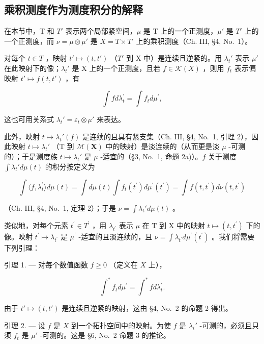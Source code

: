 \subsection{乘积测度作为测度积分的解释}

在本节中，T 和 \(T'\) 表示两个局部紧空间，\(\mu\) 是 T 上的一个正测度，\(\mu'\) 是 \(T'\) 上的一个正测度，而 \(\nu = \mu \otimes \mu'\) 是 \(X = T \times T'\) 上的乘积测度（Ch. III, §4, No.~1）。

对每个 \(t \in T\) ，映射 \(t' \mapsto (t, t')\) （\(T'\) 到 X 中）是连续且逆紧的。用 \(\lambda_t'\) 表示 \(\mu'\) 在此映射下的像；\(\lambda_t'\) 是 X 上的一个正测度，且若 \(f \in \mathcal{K}(X)\) ，则用 \(f_t\) 表示偏映射 \(t' \mapsto f(t, t')\) ，有

\[
\int f d \lambda_ {t} ^ {\prime} = \int f _ {t} d \mu^ {\prime},\tag{1}
\]

这也可用关系式 \(\lambda_t' = \varepsilon_t \otimes \mu'\) 来表达。

此外，映射 \(t \mapsto \lambda_t'(f)\) 是连续的且具有紧支集（Ch. III, §4, No.~1, 引理 2），因此映射 \(t \mapsto \lambda_t'\) （T 到 \(\mathcal{M}(\mathbf{X})\) 中的映射）是淡连续的（从而更是淡 \(\mu\) -可测的）；于是测度族 \(t \mapsto \lambda_t'\) 是 \(\mu\) -适宜的（§3, No.~1, 命题 2a)）。\(f\) 关于测度 \(\int \lambda_t' d\mu(t)\) 的积分按定义为

\[
\int \langle f, \lambda_ {t} ^ {\prime} \rangle d \mu (t) = \int d \mu (t) \int f _ {t} (t ^ {\prime}) d \mu^ {\prime} (t ^ {\prime}) = \int f (t, t ^ {\prime}) d \nu (t, t ^ {\prime})
\]

（Ch. III, §4, No.~1, 定理 2）；于是 \(\nu = \int \lambda_t' d\mu(t)\) 。

类似地，对每个元素 \(t^{\prime} \in T^{\prime}\) ，用 \(\lambda_{t^{\prime}}\) 表示 \(\mu\) 在 T 到 X 中的映射 \(t \mapsto (t, t^{\prime})\) 下的像。映射 \(t^{\prime} \mapsto \lambda_{t^{\prime}}\) 是 \(\mu^{\prime}\) -适宜的且淡连续的，且 \(\nu = \int \lambda_{t^{\prime}} d\mu^{\prime}(t^{\prime})\) 。我们将需要下列引理：

引理 1. --- 对每个数值函数 \(f \geqslant 0\) （定义在 \(X\) 上），

\[
\int^ {*} f _ {t} d \mu^ {\prime} = \int^ {*} f d \lambda_ {t} ^ {\prime}.\tag{2}
\]

由于 \(t' \mapsto (t, t')\) 是连续且逆紧的映射，这由 §4, No.~2 的命题 2 得出。

引理 2. --- 设 \(f\) 是 \(X\) 到一个拓扑空间中的映射。为使 \(f\) 是 \(\lambda_t'\) -可测的，必须且只须 \(f_t\) 是 \(\mu'\) -可测的。这是 §6, No.~2 命题 3 的推论。

